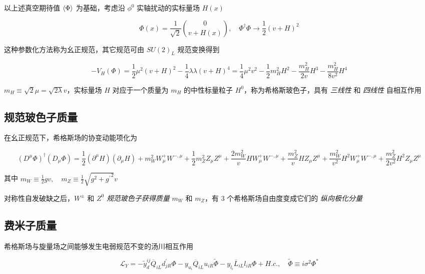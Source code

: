 以上述真空期待值 $\Braket{\Phi}$ 为基础，考虑沿 $\phi^0$ 实轴扰动的实标量场 $H(x)$

\begin{equation}
    \Phi(x) = \frac{1}{\sqrt{2}} \binom{0}{v + H(x)}, \quad \Phi^\dagger \Phi \to \frac{1}{2} (v+H)^2
\end{equation}

这种参数化方法称为幺正规范，其它规范可由 $SU(2)_L$ 规范变换得到

\begin{equation}
    -V_H(\Phi) = \frac{1}{2} \mu^2 (v+H)^2 - \frac{1}{4} \lambda \lambda (v+H)^4 = \frac{1}{4} \mu^2 v^2 - \frac{1}{2} m_H^2 H^2 - \frac{m_H^2}{2 v} H^3 - \frac{m_H^2}{8 v^2} H^4
\end{equation}

$m_H \equiv \sqrt{2}\mu = \sqrt{2\lambda} v$，实标量场 $H$ 对应于一个质量为 $m_H$ 的中性标量粒子 $H^0$，称为希格斯玻色子，具有 \emph{三线性} 和 \emph{四线性} 自相互作用

\subsection{规范玻色子质量}

在幺正规范下，希格斯场的协变动能项化为

\begin{equation}
    (D^\mu \Phi)^\dagger (D_\mu \Phi) = \frac{1}{2} (\partial^\mu H)(\partial_\mu H) + m_W^2 W_\mu^+ W^{-,\mu} + \frac{1}{2} m_Z^2 Z_\mu Z^\mu + \frac{2 m_W^2}{v} H W_\mu^+ W^{-,\mu} + \frac{m_Z^2}{v} H Z_\mu Z^\mu + \frac{m_W^2}{v^2} H^2 W_\mu^+ W^{-,\mu} + \frac{m_Z^2}{2 v^2} H^2 Z_\mu Z^\mu
\end{equation}

其中 $m_W \equiv \frac{1}{2} gv, \quad m_Z \equiv \frac{1}{2} \sqrt{g^2 + {g^\prime}^2} v$

对称性自发破缺之后，$W^\pm$ 和 $Z^0$ \emph{规范玻色子获得质量} $m_W$ 和 $m_Z$，有 3 个希格斯场自由度变成它们的 \emph{纵向极化分量}

\subsection{费米子质量}

希格斯场与旋量场之间能够发生电弱规范不变的汤川相互作用

\begin{equation}
    \mathcal{L}_{Y} = -\tilde{y}_d^{ij} \overline{Q}_{iL} d_{jR}^\prime \Phi - y_{u_i} \overline{Q}_{iL} u_{iR} \tilde{\Phi} - y_{l_i} \overline{L}_{iL} l_{iR} \Phi + H.c. , \quad \tilde{\Phi} \equiv i \sigma^2 \Phi^*
\end{equation}

